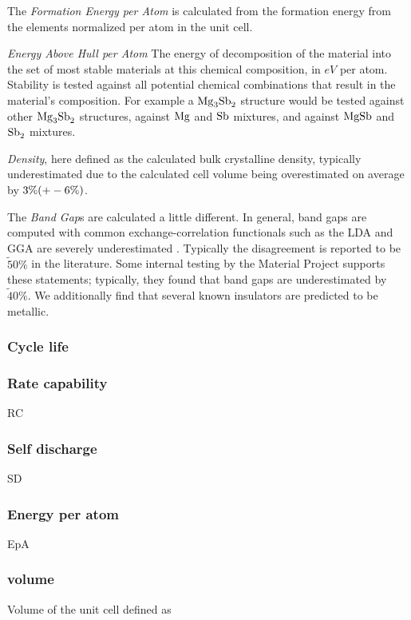 The \textit{Formation Energy per Atom} is calculated from the formation energy from the elements normalized per atom in the unit cell.

\textit{Energy Above Hull per Atom}
The energy of decomposition of the material into the set of most stable materials at this chemical composition, in $eV$ per atom. Stability is tested against all potential chemical combinations that result in the material's composition. For example a $\ce{Mg_3Sb_2}$ structure would be tested against other $\ce{Mg_3Sb_2}$ structures, against $\ce{Mg}$ and $\ce{Sb}$ mixtures, and against $\ce{MgSb}$ and $\ce{Sb_2}$ mixtures. 

\textit{Density}, here defined as the calculated bulk crystalline density, typically underestimated due to the calculated cell volume being overestimated on average by $3\% (+\/- 6\%)$.

The \textit{Band Gap}s are calculated a little different. In general, band gaps are computed with common exchange-correlation functionals such as the LDA \cite{perdew1983physical} and GGA are severely underestimated \cite{perdew1985density}. Typically the disagreement is reported to be $\tilde 50\%$ in the literature. Some internal testing by the Material Project supports these statements; typically, they found that band gaps are underestimated by $\tilde40\%$. We additionally find that several known insulators are predicted to be metallic. 
	
	\subsubsection*{Cycle life}
	
	

	\subsubsection*{Rate capability}
	RC
	\subsubsection*{Self discharge}
	SD
	\subsubsection*{Energy per atom}
	EpA
	\subsubsection*{volume}
	Volume of the unit cell defined as 
	

